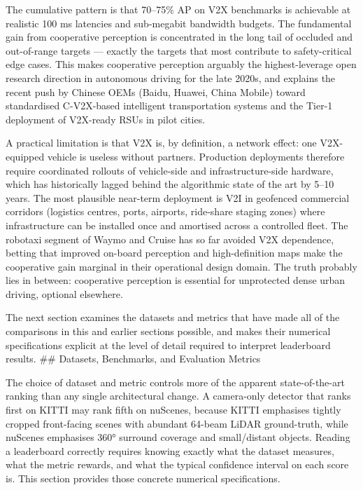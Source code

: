 The cumulative pattern is that 70--75\% AP on V2X benchmarks is achievable at realistic 100 ms latencies and sub-megabit bandwidth budgets. The fundamental gain from cooperative perception is concentrated in the long tail of occluded and out-of-range targets --- exactly the targets that most contribute to safety-critical edge cases. This makes cooperative perception arguably the highest-leverage open research direction in autonomous driving for the late 2020s, and explains the recent push by Chinese OEMs (Baidu, Huawei, China Mobile) toward standardised C-V2X-based intelligent transportation systems and the Tier-1 deployment of V2X-ready RSUs in pilot cities.

A practical limitation is that V2X is, by definition, a network effect: one V2X-equipped vehicle is useless without partners. Production deployments therefore require coordinated rollouts of vehicle-side and infrastructure-side hardware, which has historically lagged behind the algorithmic state of the art by 5--10 years. The most plausible near-term deployment is V2I in geofenced commercial corridors (logistics centres, ports, airports, ride-share staging zones) where infrastructure can be installed once and amortised across a controlled fleet. The robotaxi segment of Waymo and Cruise has so far avoided V2X dependence, betting that improved on-board perception and high-definition maps make the cooperative gain marginal in their operational design domain. The truth probably lies in between: cooperative perception is essential for unprotected dense urban driving, optional elsewhere.

The next section examines the datasets and metrics that have made all of the comparisons in this and earlier sections possible, and makes their numerical specifications explicit at the level of detail required to interpret leaderboard results.
\#\# Datasets, Benchmarks, and Evaluation Metrics

The choice of dataset and metric controls more of the apparent state-of-the-art ranking than any single architectural change. A camera-only detector that ranks first on KITTI may rank fifth on nuScenes, because KITTI emphasises tightly cropped front-facing scenes with abundant 64-beam LiDAR ground-truth, while nuScenes emphasises 360° surround coverage and small/distant objects. Reading a leaderboard correctly requires knowing exactly what the dataset measures, what the metric rewards, and what the typical confidence interval on each score is. This section provides those concrete numerical specifications.

